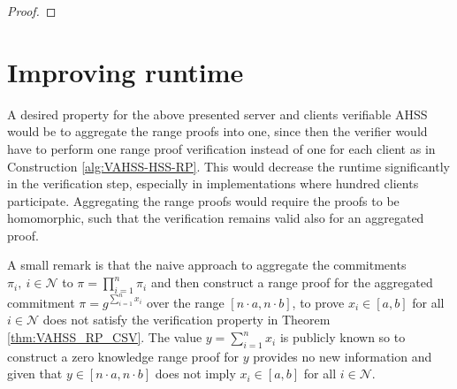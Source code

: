 \begin{proof}

\end{proof}


\section{Improving runtime}
\label{sec:aggregation}
A desired property for the above presented server and clients verifiable AHSS would be to aggregate the range proofs into one, since then the verifier would have to perform one range proof verification instead of one for each client as in Construction \ref{alg:VAHSS-HSS-RP}. This would decrease the runtime significantly in the verification step, especially in implementations where hundred clients participate. Aggregating the range proofs would require the proofs to be homomorphic, such that the verification remains valid also for an aggregated proof.

A small remark is that the naive approach to aggregate the commitments $\pi_i, \: i\in\mathcal{N}$ to $\pi = \prod_{i=1}^n \pi_i$ and then construct a range proof for the aggregated commitment $\pi = g^{\sum_{i=1}^n x_i}$ over the range $[n\cdot a,n\cdot b]$, to prove $x_i \in [a,b]$ for all $i \in\mathcal{N}$  does not satisfy the verification property in Theorem \ref{thm:VAHSS_RP_CSV}. The value $y=\sum_{i=1}^n x_i$ is publicly known so to construct a zero knowledge range proof for $y $ provides no new information and given that $y\in [n\cdot a,n\cdot b]$ does not imply $x_i\in [a,b]$ for all $i\in\mathcal{N}$. 

